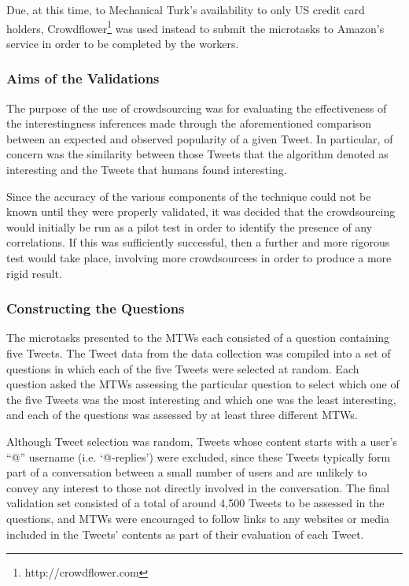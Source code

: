 Due, at this time, to Mechanical Turk's availability to only US credit card holders, Crowdflower\footnote{http://crowdflower.com} was used instead to submit the microtasks to Amazon's service in order to be completed by the workers. 


\subsubsection{Aims of the Validations}
The purpose of the use of crowdsourcing was for evaluating the effectiveness of the interestingness inferences made through the aforementioned comparison between an expected and observed popularity of a given Tweet. In particular, of concern was the similarity between those Tweets that the algorithm denoted as interesting and the Tweets that humans found interesting.

Since the accuracy of the various components of the technique could not be known until they were properly validated, it was decided that the crowdsourcing would initially be run as a pilot test in order to identify the presence of any correlations. If this was sufficiently successful, then a further and more rigorous test would take place, involving more crowdsourcees in order to produce a more rigid result.


\subsubsection{Constructing the Questions}
The microtasks presented to the MTWs each consisted of a question containing five Tweets. The Tweet data from the data collection was compiled into a set of questions in which each of the five Tweets were selected at random. Each question asked the MTWs assessing the particular question to select which one of the five Tweets was the most interesting and which one was the least interesting, and each of the questions was assessed by at least three different MTWs.

Although Tweet selection was random, Tweets whose content starts with a user's ``@'' username (i.e. `@-replies') were excluded, since these Tweets typically form part of a conversation between a small number of users and are unlikely to convey any interest to those not directly involved in the conversation. The final validation set consisted of a total of around 4,500 Tweets to be assessed in the questions, and MTWs were encouraged to follow links to any websites or media included in the Tweets' contents as part of their evaluation of each Tweet.



